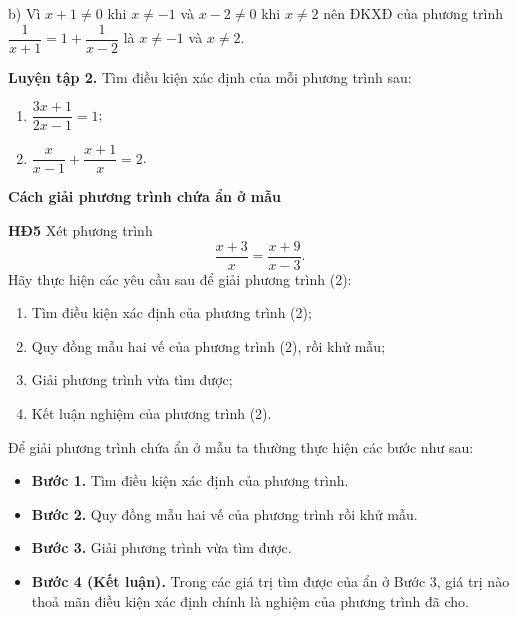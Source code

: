 \begin{lesson}
    b) Vì $x+1\ne0$ khi $x\ne-1$ và $x-2\ne0$ khi $x\ne2$ nên ĐKXĐ của phương trình $\dfrac{1}{x+1}=1+\dfrac{1}{x-2}$ là $x\ne-1$ và $x\ne2$.

    \textbf{Luyện tập 2.} Tìm điều kiện xác định của mỗi phương trình sau:
    \begin{enumerate}[label=\alph*)]
        \item $\dfrac{3x+1}{2x-1}=1$;

        \answerline
        \item $\dfrac{x}{x-1}+\dfrac{x+1}{x}=2$.

        \answerline
    \end{enumerate}

    \textbf{Cách giải phương trình chứa ẩn ở mẫu}

    \textbf{HĐ5} Xét phương trình
    \[
        \dfrac{x+3}{x}=\dfrac{x+9}{x-3}. \tag{2}
    \]
    Hãy thực hiện các yêu cầu sau để giải phương trình (2):
    \begin{enumerate}[label=\alph*)]
        \item Tìm điều kiện xác định của phương trình (2);

        \answerline
        \item Quy đồng mẫu hai vế của phương trình (2), rồi khử mẫu;

        \answerline
        \item Giải phương trình vừa tìm được;

        \answerline
        \item Kết luận nghiệm của phương trình (2).

        \answerline
    \end{enumerate}

    \begin{keyconcept}
        Để giải phương trình chứa ẩn ở mẫu ta thường thực hiện các bước như sau:
        \begin{itemize}
            \item \textbf{Bước 1.} Tìm điều kiện xác định của phương trình.
            \item \textbf{Bước 2.} Quy đồng mẫu hai vế của phương trình rồi khử mẫu.
            \item \textbf{Bước 3.} Giải phương trình vừa tìm được.
            \item \textbf{Bước 4 (Kết luận).} Trong các giá trị tìm được của ẩn ở Bước 3, giá trị nào thoả mãn điều kiện xác định chính là nghiệm của phương trình đã cho.
        \end{itemize}
    \end{keyconcept}


\end{lesson}
